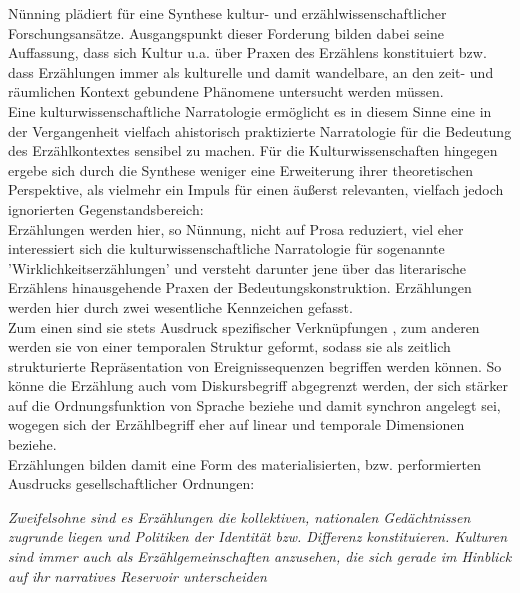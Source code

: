  Nünning plädiert für eine Synthese kultur-
und erzählwissenschaftlicher Forschungsansätze.\footnotemark {}
Ausgangspunkt dieser Forderung
bilden dabei seine Auffassung, dass sich Kultur u.a. über Praxen des Erzählens
konstituiert bzw. dass Erzählungen immer als kulturelle und damit wandelbare,
an den zeit- und räumlichen Kontext gebundene Phänomene untersucht werden
müssen. \\
Eine kulturwissenschaftliche Narratologie ermöglicht es in diesem Sinne
eine in der Vergangenheit vielfach ahistorisch praktizierte Narratologie für
die Bedeutung des Erzählkontextes sensibel zu machen. Für die
Kulturwissenschaften hingegen ergebe sich durch die Synthese weniger eine
Erweiterung ihrer theoretischen Perspektive, als vielmehr ein Impuls für einen
äußerst relevanten, vielfach jedoch ignorierten Gegenstandsbereich: \\
Erzählungen
werden hier, so Nünnung, nicht auf Prosa reduziert, viel eher interessiert sich
die kulturwissenschaftliche Narratologie für sogenannte
'Wirklichkeitserzählungen' und versteht darunter jene über das literarische
Erzählens hinausgehende Praxen der Bedeutungskonstruktion. Erzählungen werden
hier durch zwei wesentliche Kennzeichen gefasst. \\
Zum einen sind sie stets
Ausdruck \glqq spezifischer Verknüpfungen \grqq\footnotemark
{}, zum anderen werden sie von einer
\glqq temporalen Struktur \grqq\footnotemark {}  geformt, sodass sie als \glqq zeitlich strukturierte
Repräsentation von Ereignissequenzen\grqq\footnotemark {} begriffen werden können. So könne die
Erzählung auch vom Diskursbegriff abgegrenzt werden, der sich stärker auf die
Ordnungsfunktion von Sprache beziehe und damit synchron angelegt sei, wogegen
sich der Erzählbegriff eher auf linear und temporale Dimensionen
beziehe.\footnotemark {}
\\
Erzählungen bilden damit eine Form des materialisierten, bzw. performierten
Ausdrucks gesellschaftlicher Ordnungen:
\begin{myenv}
  \textit{
  \glqq Zweifelsohne sind es Erzählungen die kollektiven, nationalen
  Gedächtnissen zugrunde liegen und Politiken der Identität bzw. Differenz
  konstituieren. Kulturen sind immer auch als Erzählgemeinschaften anzusehen,
  die sich gerade im Hinblick auf ihr narratives Reservoir unterscheiden \grqq\footnotemark {}
  } \end{myenv}

